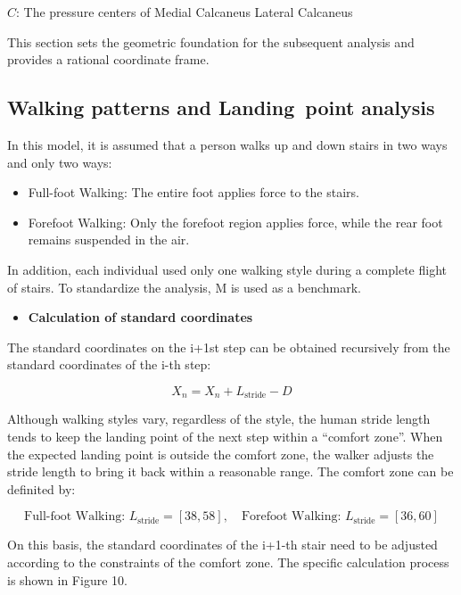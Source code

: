 \documentclass{mcmthesis}
\begin{document}
  \(C\): The pressure centers of Medial Calcaneus Lateral Calcaneus 
  
  This section sets the geometric foundation for the subsequent analysis and provides a rational coordinate frame.
  
  
  \subsection{Walking patterns and Landing point analysis}
  
  In this model, it is assumed that a person walks up and down stairs in two ways and only two ways:
  
  \begin{itemize}
    \item Full-foot Walking: The entire foot applies force to the stairs.
  
    \item Forefoot Walking: Only the forefoot region applies force, while the rear foot remains suspended in the air.
  \end{itemize}
  
  
  In addition, each individual used only one walking style during a complete flight of stairs. To standardize the analysis, M is used as a benchmark.
  
  \begin{itemize}[label=$\diamond$]
  \item \textbf{Calculation of standard coordinates}
  \end{itemize}
  
  The standard coordinates on the i+1st step can be obtained recursively from the standard coordinates of the i-th step:
  
  \[
  X_n = X_n + L_{\text{stride}} - D
  \]
  
  
  Although walking styles vary, regardless of the style, the human stride length tends to keep the landing point of the next step within a “comfort zone”. When the expected landing point is outside the comfort zone, the walker adjusts the stride length to bring it back within a reasonable range. The comfort zone can be definited by:
  
\[
\text{Full-foot Walking: } L_{\text{stride}} = [38, 58], \quad \text{Forefoot Walking: } L_{\text{stride}} = [36, 60]
\]


  On this basis, the standard coordinates of the i+1-th stair need to be adjusted according to the constraints of the comfort zone. The specific calculation process is shown in Figure 10. 
  
\end{document}
